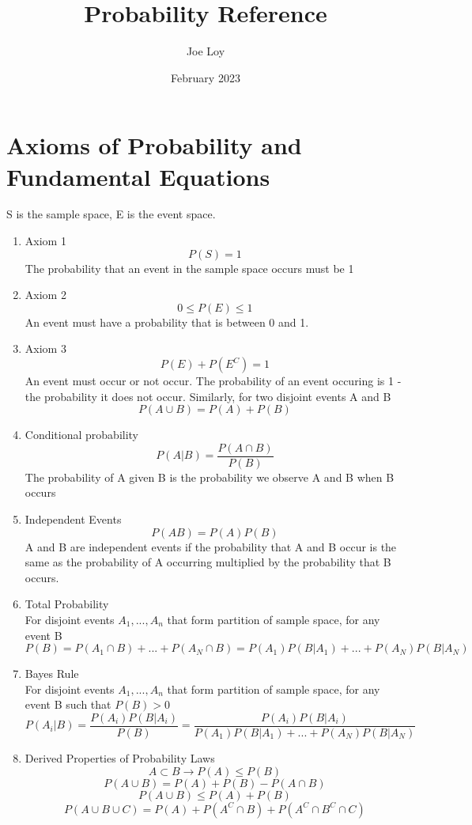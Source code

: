 \documentclass{article}
\title{Probability Reference}
\author{Joe Loy}
\date{February 2023}
\begin{document}
\maketitle

\section{Axioms of Probability and Fundamental Equations}
S is the sample space, E is the event space. 
\begin{enumerate}
    \item Axiom 1 \\ 
    $$P(S) = 1$$
    The probability that an event in the sample space occurs must be 1
    \item Axiom 2 \\
    $$0 \leq P(E) \leq 1$$
    An event must have a probability that is between 0 and 1.
    
    \item Axiom 3 \\
    $$P(E) + P(E^C) = 1  $$
    An event must occur or not occur. The probability of an event occuring is 1 - the probability it does not occur. Similarly, for two disjoint events A and B
    $$P(A \cup B) = P(A) + P(B)$$

    \item Conditional probability \\
    $$P(A|B) = \frac{P(A \cap B)}{P(B)} $$
    The probability of A given B is the probability we observe A and B when B occurs

    \item Independent Events \\ 
    $$P(AB) = P(A)P(B)$$
    A and B are independent events if the probability that A and B occur is the same as the probability of A occurring multiplied by the probability that B occurs.

    \item Total Probability \\
    For disjoint events $A_1,...,A_n$ that form partition of sample space, for any event B
    $$P(B) = P(A_1 \cap B) + ... + P(A_N \cap B) = P(A_1)P(B|A_1) + ... + P(A_N)P(B|A_N)$$

    \item Bayes Rule \\ 
    For disjoint events $A_1,...,A_n$ that form partition of sample space, for any event B such that $P(B) > 0$
    $$P(A_i|B) = \frac{P(A_i)P(B|A_i)}{P(B)} = \frac{P(A_i)P(B|A_i)}{P(A_1)P(B|A_1) + ... + P(A_N)P(B|A_N)}$$

    \item Derived Properties of Probability Laws \\
    $$A \subset B \to P(A) \leq P(B)$$
    $$P(A \cup B) = P(A) + P(B) - P(A \cap B)$$
    $$P(A \cup B) \leq P(A) + P(B)$$
    $$P(A \cup B \cup C) = P(A) + P(A^C \cap B) + P(A^C \cap B^C \cap C)$$
\end{enumerate}
\end{document}
